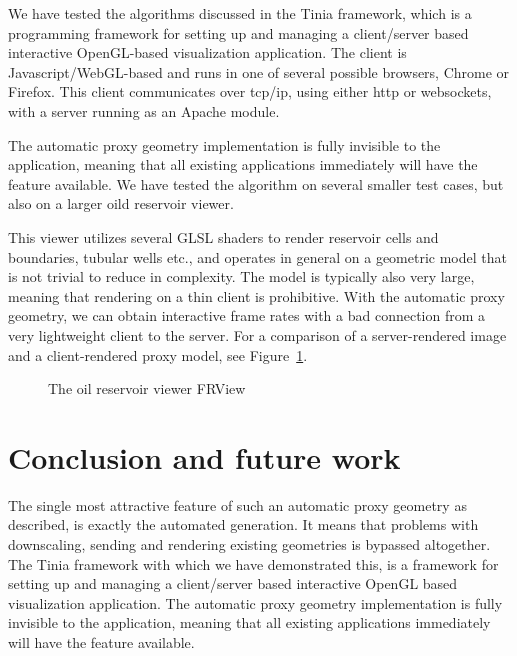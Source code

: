 We have tested the algorithms discussed in the Tinia framework, which is a
programming framework for setting up and managing a client/server based
interactive OpenGL-based visualization application. The client is
Javascript/WebGL-based and runs in one of several possible browsers, \eg Chrome
or Firefox. This client communicates over tcp/ip, using either http or
websockets, with a server running as an Apache module.

The automatic proxy geometry implementation is fully invisible to the
application, meaning that all existing applications immediately will have the
feature available. We have tested the algorithm on several smaller test cases,
but also on a larger oild reservoir viewer.

This viewer utilizes several GLSL shaders to render reservoir cells and
boundaries, tubular wells etc., and operates in general on a geometric model
that is not trivial to reduce in complexity. The model is typically also very
large, meaning that rendering on a thin client is prohibitive. With the
automatic proxy geometry, we can obtain interactive frame rates with a bad
connection from a very lightweight client to the server. For a comparison of a
server-rendered image and a client-rendered proxy model, see
Figure~\ref{fig:FRView}.

\begin{figure}[htb]
  \centering
  \caption{\label{fig:FRView}
           The oil reservoir viewer FRView}
\end{figure}


\section{Conclusion and future work}

The single most attractive feature of such an automatic proxy geometry as
described, is exactly the automated generation. It means that problems with
downscaling, sending and rendering existing geometries is bypassed
altogether. The Tinia framework with which we have demonstrated this, is a
framework for setting up and managing a client/server based interactive OpenGL
based visualization application. The automatic proxy geometry implementation is
fully invisible to the application, meaning that all existing applications
immediately will have the feature available.

